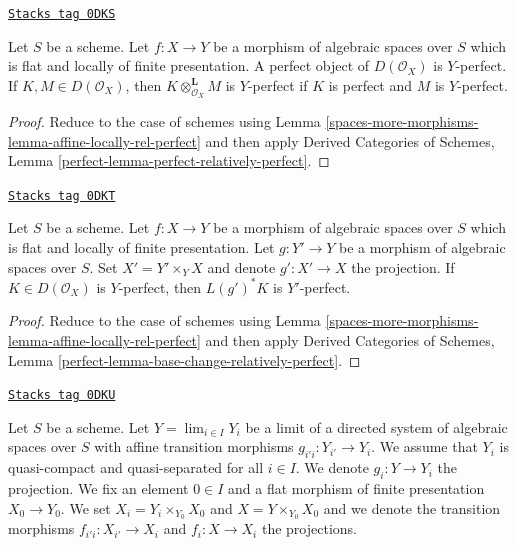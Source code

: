 \begin{lemma}
\label{spaces-more-morphisms-lemma-perfect-relatively-perfect}
\href{https://stacks.math.columbia.edu/tag/0DKS}{\texttt{Stacks tag 0DKS}}

Let $S$ be a scheme.
Let $f : X \to Y$ be a morphism of algebraic spaces over $S$
which is flat and locally of finite presentation.
A perfect object of $D(\mathcal{O}_X)$ is $Y$-perfect.
If $K, M \in D(\mathcal{O}_X)$, then $K \otimes_{\mathcal{O}_X}^\mathbf{L} M$
is $Y$-perfect if $K$ is perfect and $M$ is $Y$-perfect.
\end{lemma}

\begin{proof}
Reduce to the case of schemes using
Lemma \ref{spaces-more-morphisms-lemma-affine-locally-rel-perfect}
and then apply
Derived Categories of Schemes, Lemma
\ref{perfect-lemma-perfect-relatively-perfect}.
\end{proof}

\begin{lemma}
\label{spaces-more-morphisms-lemma-base-change-relatively-perfect}
\href{https://stacks.math.columbia.edu/tag/0DKT}{\texttt{Stacks tag 0DKT}}

Let $S$ be a scheme.
Let $f : X \to Y$ be a morphism of algebraic spaces over $S$
which is flat and locally of finite presentation.
Let $g : Y' \to Y$ be a morphism of algebraic spaces over $S$.
Set $X' = Y' \times_Y X$ and denote $g' : X' \to X$ the projection.
If $K \in D(\mathcal{O}_X)$ is $Y$-perfect, then $L(g')^*K$
is $Y'$-perfect.
\end{lemma}

\begin{proof}
Reduce to the case of schemes using
Lemma \ref{spaces-more-morphisms-lemma-affine-locally-rel-perfect}
and then apply
Derived Categories of Schemes, Lemma
\ref{perfect-lemma-base-change-relatively-perfect}.
\end{proof}

\begin{definition}
\label{spaces-more-morphisms-situation-relative-descent}
\href{https://stacks.math.columbia.edu/tag/0DKU}{\texttt{Stacks tag 0DKU}}

Let $S$ be a scheme.
Let $Y = \lim_{i \in I} Y_i$ be a limit of a directed system of
algebraic spaces over $S$
with affine transition morphisms $g_{i'i} : Y_{i'} \to Y_i$.
We assume that $Y_i$ is quasi-compact and quasi-separated for all $i \in I$.
We denote $g_i : Y \to Y_i$ the projection. We fix an element $0 \in I$
and a flat morphism of finite presentation $X_0 \to Y_0$.
We set $X_i = Y_i \times_{Y_0} X_0$ and $X = Y \times_{Y_0} X_0$
and we denote the transition morphisms $f_{i'i} : X_{i'} \to X_i$
and $f_i : X \to X_i$ the projections.
\end{definition}

